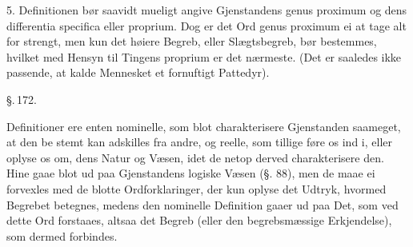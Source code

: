 \documentclass[12pt]{book}
\def\textit#1{#1}%
\def\emph#1{#1}%
\newcommand{\parag}[1]{%
  \par\vspace{0.9\baselineskip}%
  {\centering\textit{\S.\,#1.}\par}%
  \vspace{0.35\baselineskip}%
  \noindent\hspace{\parindent}\ignorespaces
}
\newcommand{\opage}[1]{\marginnote{\footnotesize\textit{[#1]}}}
\begin{document}
5. Definitionen bør saavidt mueligt angive Gjenstandens
\textit{genus proximum} og dens \textit{differentia specifica} eller
\textit{proprium}. Dog er det Ord \textit{genus proximum} ei at tage alt for
strengt, men kun det høiere Begreb, eller Slægtsbegreb, bør bestemmes,
hvilket med Hensyn til Tingens \textit{proprium} er det nærmeste. (Det er
saaledes ikke passende, at kalde Mennesket et fornuftigt Pattedyr).

\parag{172}

Definitioner ere enten \emph{nominelle}, som blot charakterisere Gjenstanden
saameget, at den be%
\opage{372}stemt kan adskilles fra andre, og \emph{reelle}, som tillige føre os ind i,
eller oplyse os om, dens \emph{Natur og Væsen}, idet de netop derved
charakterisere den. Hine gaae blot ud paa Gjenstandens
\emph{logiske Væsen} (§. 88), men de maae ei forvexles med de blotte
\emph{Ordforklaringer}, der kun oplyse det Udtryk, hvormed Begrebet betegnes,
medens den nominelle Definition gaaer ud paa Det, som ved dette Ord
forstaaes, altsaa det Begreb (eller den begrebsmæssige Erkjendelse), som
dermed forbindes.
\end{document}
